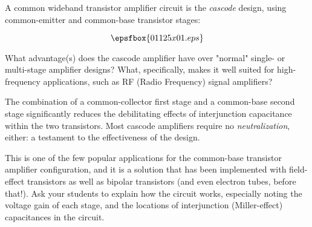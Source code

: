 

A common wideband transistor amplifier circuit is the {\it cascode} design, using common-emitter and common-base transistor stages:

$$\epsfbox{01125x01.eps}$$

What advantage(s) does the cascode amplifier have over "normal" single- or multi-stage amplifier designs?  What, specifically, makes it well suited for high-frequency applications, such as RF (Radio Frequency) signal amplifiers?







The combination of a common-collector first stage and a common-base second stage significantly reduces the debilitating effects of interjunction capacitance within the two transistors.  Most cascode amplifiers require no {\it neutralization}, either: a testament to the effectiveness of the design.







This is one of the few popular applications for the common-base transistor amplifier configuration, and it is a solution that has been implemented with field-effect transistors as well as bipolar transistors (and even electron tubes, before that!).  Ask your students to explain how the circuit works, especially noting the voltage gain of each stage, and the locations of interjunction (Miller-effect) capacitances in the circuit.




